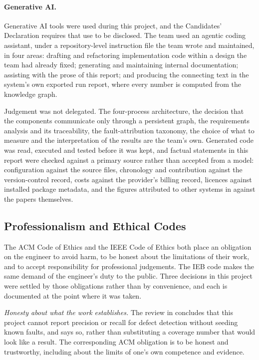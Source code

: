 \paragraph{Generative AI.} Generative AI tools were used during this project,
and the Candidates' Declaration requires that use to be disclosed. The team
used an agentic coding assistant, under a repository-level instruction file the
team wrote and maintained, in four areas: drafting and refactoring
implementation code within a design the team had already fixed; generating and
maintaining internal documentation; assisting with the prose of this report;
and producing the connecting text in the system's own exported run report,
where every number is computed from the knowledge graph.

Judgement was not delegated. The four-process architecture, the decision that
the components communicate only through a persistent graph, the requirements
analysis and its traceability, the fault-attribution taxonomy, the choice of
what to measure and the interpretation of the results are the team's own.
Generated code was read, executed and tested before it was kept, and factual
statements in this report were checked against a primary source rather than
accepted from a model: configuration against the source files, chronology and
contribution against the version-control record, costs against the provider's
billing record, licences against installed package metadata, and the figures
attributed to other systems in  against the papers
themselves.

\subsection{Professionalism and Ethical Codes}
\label{sec:codes}

The ACM Code of Ethics and the IEEE Code of Ethics both place an obligation on
the engineer to avoid harm, to be honest about the limitations of their work,
and to accept responsibility for professional judgements. The IEB code makes
the same demand of the engineer's duty to the public. Three decisions in this
project were settled by those obligations rather than by convenience, and each
is documented at the point where it was taken.

\emph{Honesty about what the work establishes.} The review in
 concludes that this project cannot report precision or
recall for defect detection without seeding known faults, and says so, rather
than substituting a coverage number that would look like a result. The
corresponding ACM obligation is to be honest and trustworthy, including about
the limits of one's own competence and evidence.

